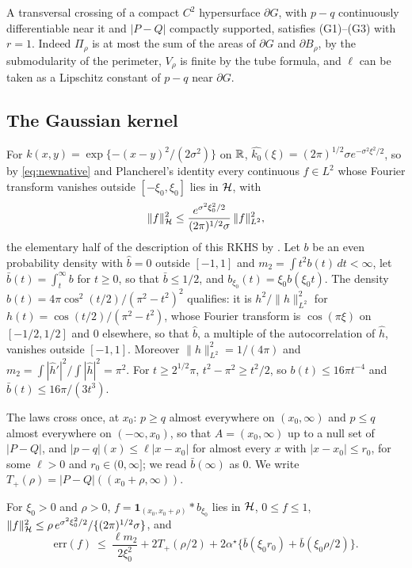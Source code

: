 A transversal crossing of a compact $C^2$ hypersurface $\partial G$, with $p-q$ continuously differentiable near it and
$|P-Q|$ compactly supported, satisfies (G1)--(G3) with $r=1$. Indeed $\Pi_\rho$ is at most the sum of the areas of $\partial G$
and $\partial B_\rho$, by the submodularity of the perimeter, $V_\rho$ is finite by the tube formula, and $\ell$ can be
taken as a Lipschitz constant of $p-q$ near $\partial G$.

\subsection{The Gaussian kernel}

For $k(x,y)=\exp\{-(x-y)^2/(2\sigma^2)\}$ on $\mathbb{R}$, $\widehat{k_0}(\xi)=(2\pi)^{1/2}\sigma e^{-\sigma^2\xi^2/2}$, so by
\eqref{eq:newnative} and Plancherel's identity every continuous $f\in L^2$ whose Fourier transform vanishes outside
$[-\xi_0,\xi_0]$ lies in $\mathcal{H}$, with
\begin{equation}
\|f\|_{\mathcal{H}}^2\le\frac{e^{\sigma^2\xi_0^2/2}}{(2\pi)^{1/2}\sigma}\,\|f\|_{L^2}^2 ,
\label{eq:newbandlim}
\end{equation}
the elementary half of the description of this RKHS by \citet{steinwart2006explicit}. Let $b$ be an even probability
density with $\widehat b=0$ outside $[-1,1]$ and $m_2=\int t^2b(t)\,dt<\infty$, let $\bar b(t)=\int_t^\infty b$ for $t\ge0$, so that
$\bar b\le1/2$, and $b_{\xi_0}(t)=\xi_0 b(\xi_0 t)$. The density $b(t)=4\pi\cos^2(t/2)/(\pi^2-t^2)^2$ qualifies: it is $h^2/\|h\|_{L^2}^2$
for $h(t)=\cos(t/2)/(\pi^2-t^2)$, whose Fourier transform is $\cos(\pi\xi)$ on $[-1/2,1/2]$ and $0$ elsewhere, so that
$\widehat b$, a multiple of the autocorrelation of $\widehat h$, vanishes outside $[-1,1]$. Moreover $\|h\|_{L^2}^2=1/(4\pi)$ and
$m_2=\int|\widehat h'|^2/\int|\widehat h|^2=\pi^2$. For $t\ge2^{1/2}\pi$, $t^2-\pi^2\ge t^2/2$, so $b(t)\le16\pi t^{-4}$ and
$\bar b(t)\le16\pi/(3t^3)$.

The laws cross once, at $x_0$: $p\ge q$ almost everywhere on $(x_0,\infty)$ and $p\le q$ almost everywhere on
$(-\infty,x_0)$, so that $A=(x_0,\infty)$ up to a null set of $|P-Q|$, and $|p-q|(x)\le\ell|x-x_0|$ for almost every
$x$ with $|x-x_0|\le r_0$, for some $\ell>0$ and $r_0\in(0,\infty]$; we read $\bar b(\infty)$ as $0$. We write
$T_+(\rho)=|P-Q|((x_0+\rho,\infty))$.

\begin{lemma}
\label{lem:newgaussstep}
For $\xi_0>0$ and $\rho>0$, $f=\mathbf 1_{(x_0,x_0+\rho)}*b_{\xi_0}$ lies in $\mathcal{H}$, $0\le f\le1$,
$\|f\|_{\mathcal{H}}^2\le\rho\,e^{\sigma^2\xi_0^2/2}/\{(2\pi)^{1/2}\sigma\}$, and
\[
\mathrm{err}(f)\ \le\ \frac{\ell m_2}{2\xi_0^2}+2T_+(\rho/2)+2\alpha^\star\{\bar b(\xi_0 r_0)+\bar b(\xi_0\rho/2)\} .
\]
\end{lemma}

